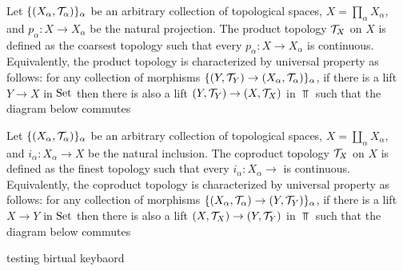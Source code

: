 \documentclass{report}
\begin{document}
\begin{definition}
    Let $\{(X_\alpha, \mathcal{T}_\alpha)\}_\alpha$ be an arbitrary collection of topological spaces, $X = \prod_\alpha X_\alpha$, and $p_\alpha: X \to X_\alpha$ be the natural projection. The product topology $\mathcal{T}_X$ on $X$ is defined as the coarsest topology such that every $p_\alpha: X \to X_\alpha$ is continuous. Equivalently, the product topology is characterized by universal property as follows: for any collection of morphisms $\{(Y, \mathcal{T}_Y) \to (X_\alpha, \mathcal{T}_\alpha)\}_\alpha$, if there is a lift $Y \to X$ in $\operatorname{Set}$ then there is also a lift $(Y, \mathcal{T}_Y) \to (X, \mathcal{T}_X)$ in $\Top$ such that the diagram below commutes
    \begin{center}
    \end{center}
\end{definition}

\begin{definition}
    Let $\{(X_\alpha, \mathcal{T}_\alpha)\}_\alpha$ be an arbitrary collection of topological spaces, $X = \coprod_\alpha X_\alpha$, and $i_\alpha: X_\alpha \to X$ be the natural inclusion. The coproduct topology $\mathcal{T}_X$ on $X$ is defined as the finest topology such that every $i_\alpha: X_\alpha \to$ is continuous. Equivalently, the coproduct topology is characterized by universal property as follows: for any collection of morphisms $\{(X_\alpha, \mathcal{T}_\alpha) \to (Y, \mathcal{T}_Y)\}_\alpha$, if there is a lift $X \to Y$ in $\operatorname{Set}$ then there is also a lift $(X, \mathcal{T}_X) \to (Y, \mathcal{T}_Y)$ in $\Top$ such that the diagram below commutes
    \begin{center}
    \end{center}
\end{definition}

testing birtual keybaord
 
\end{document}
